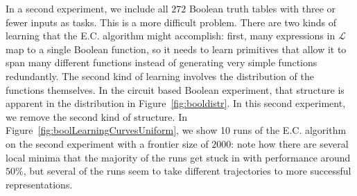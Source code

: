 \documentclass{article}
\begin{document}
In a second experiment, we include all $272$ Boolean truth tables with
three or fewer inputs as tasks. This is a more difficult
problem. There are two kinds of learning that the E.C. algorithm might
accomplish: first, many expressions in $\mathcal{L}$ map to a single
Boolean function, so it needs to learn primitives that allow it to
span many different functions instead of generating very simple
functions redundantly. The second kind of learning involves the
distribution of the functions themselves. In the circuit based Boolean
experiment, that structure is apparent in the distribution in
Figure~\ref{fig:booldistr}. In this second experiment, we remove the
second kind of structure. In
Figure~\ref{fig:boolLearningCurvesUniform}, we show 10 runs of the
E.C.  algorithm on the second experiment with a frontier size of
$2000$: note how there are several local minima that the majority of
the runs get stuck in with performance around $50\%$, but several of
the runs seem to take different trajectories to more successful
representations.
\end{document}
